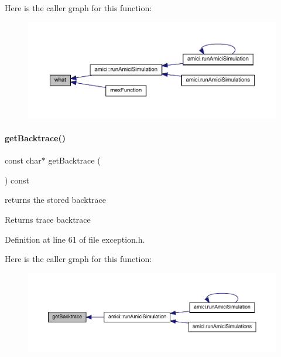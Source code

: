 Here is the caller graph for this function\+:
\nopagebreak
\begin{figure}[H]
\begin{center}
\leavevmode
\includegraphics[width=350pt]{classamici_1_1_ami_exception_a79009ed133fa02b942ddce8f0b987f3e_icgraph}
\end{center}
\end{figure}
\mbox{\label{classamici_1_1_ami_exception_abd4eec3294e3af56ff54130ca3f2dea9}} 
\paragraph{\texorpdfstring{get\+Backtrace()}{getBacktrace()}}
{\footnotesize\ttfamily const char$\ast$ get\+Backtrace (\begin{DoxyParamCaption}{ }\end{DoxyParamCaption}) const}

returns the stored backtrace \begin{DoxyReturn}{Returns}
trace backtrace 
\end{DoxyReturn}


Definition at line 61 of file exception.\+h.

Here is the caller graph for this function\+:
\nopagebreak
\begin{figure}[H]
\begin{center}
\leavevmode
\includegraphics[width=350pt]{classamici_1_1_ami_exception_abd4eec3294e3af56ff54130ca3f2dea9_icgraph}
\end{center}
\end{figure}
\mbox{\label{classamici_1_1_ami_exception_a795d2a9009cbc53d5a602e621a3a6450}} 
